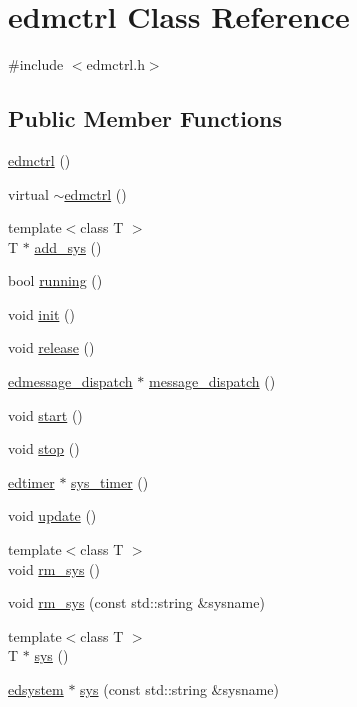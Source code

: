 \hypertarget{classedmctrl}{\section{edmctrl Class Reference}
\label{classedmctrl}
}


{\ttfamily \#include $<$edmctrl.\-h$>$}

\subsection*{Public Member Functions}
\begin{DoxyCompactItemize}
\item 
\hyperlink{classedmctrl_a4b7377b0608a92535a951caff22dbf51}{edmctrl} ()
\item 
virtual \hyperlink{classedmctrl_a4b76af2c6a4a327dae683582f73f89bf}{$\sim$edmctrl} ()
\item 
{\footnotesize template$<$class T $>$ }\\T $\ast$ \hyperlink{classedmctrl_acf2444928f98bbd396f65022ab60e6d6}{add\-\_\-sys} ()
\item 
bool \hyperlink{classedmctrl_a0dd1befe6818fcbd97419b947ffcd154}{running} ()
\item 
void \hyperlink{classedmctrl_a6b507d894977d67d598b4930521f27fa}{init} ()
\item 
void \hyperlink{classedmctrl_ad82a90b7c2c08479118607febfcadd87}{release} ()
\item 
\hyperlink{classedmessage__dispatch}{edmessage\-\_\-dispatch} $\ast$ \hyperlink{classedmctrl_a96e74e3995d187b3023fdf4ef9b2dc88}{message\-\_\-dispatch} ()
\item 
void \hyperlink{classedmctrl_aeed744e39caf7ab6fdc1004c8cf69a8d}{start} ()
\item 
void \hyperlink{classedmctrl_a36276dab82db9d425268e277dcf5fcb3}{stop} ()
\item 
\hyperlink{classedtimer}{edtimer} $\ast$ \hyperlink{classedmctrl_aa77d5e27f2665fb1c09c29cd057ec09c}{sys\-\_\-timer} ()
\item 
void \hyperlink{classedmctrl_ad9e0ab19fd2b723aedd558b0af130d6a}{update} ()
\item 
{\footnotesize template$<$class T $>$ }\\void \hyperlink{classedmctrl_a3050d02e3f473fb5638aa5c3e77a7d88}{rm\-\_\-sys} ()
\item 
void \hyperlink{classedmctrl_adb9621c87a43535ea084912387e894b8}{rm\-\_\-sys} (const std\-::string \&sysname)
\item 
{\footnotesize template$<$class T $>$ }\\T $\ast$ \hyperlink{classedmctrl_a0be60e649d1981d69099c023bc579bf3}{sys} ()
\item 
\hyperlink{classedsystem}{edsystem} $\ast$ \hyperlink{classedmctrl_a0f434a10847a095073f0897f839e428c}{sys} (const std\-::string \&sysname)
\end{DoxyCompactItemize}
